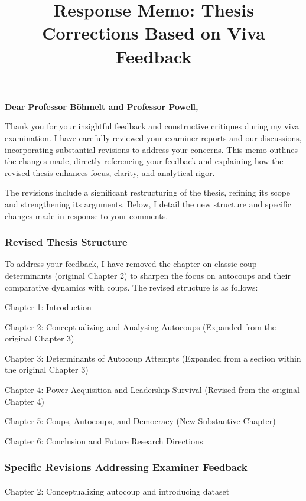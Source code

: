 \documentclass[
  12pt,
  letterpaper,
  DIV=11,
  numbers=noendperiod]{scrartcl}
\title{Response Memo: Thesis Corrections Based on Viva Feedback}
\author{}
\date{}
\makeatletter
\let\oldparagraph\paragraph
\renewcommand{\paragraph}{
    \@ifstar
      \xxxParagraphStar
      \xxxParagraphNoStar
  }
\newcommand{\xxxParagraphStar}[1]{\oldparagraph*{#1}\mbox{}}
\newcommand{\xxxParagraphNoStar}[1]{\oldparagraph{#1}\mbox{}}
\makeatother
\begin{document}
\maketitle


\textbf{Dear Professor Böhmelt and Professor Powell,}

Thank you for your insightful feedback and constructive critiques during
my viva examination. I have carefully reviewed your examiner reports and
our discussions, incorporating substantial revisions to address your
concerns. This memo outlines the changes made, directly referencing your
feedback and explaining how the revised thesis enhances focus, clarity,
and analytical rigor.

The revisions include a significant restructuring of the thesis,
refining its scope and strengthening its arguments. Below, I detail the
new structure and specific changes made in response to your comments.

\subsubsection{Revised Thesis Structure}\label{revised-thesis-structure}

To address your feedback, I have removed the chapter on classic coup
determinants (original Chapter 2) to sharpen the focus on autocoups and
their comparative dynamics with coups. The revised structure is as
follows:

Chapter 1: Introduction

Chapter 2: Conceptualizing and Analysing Autocoups (Expanded from the
original Chapter 3)

Chapter 3: Determinants of Autocoup Attempts (Expanded from a section
within the original Chapter 3)

Chapter 4: Power Acquisition and Leadership Survival (Revised from the
original Chapter 4)

Chapter 5: Coups, Autocoups, and Democracy (New Substantive Chapter)

Chapter 6: Conclusion and Future Research Directions

\subsubsection{Specific Revisions Addressing Examiner
Feedback}\label{specific-revisions-addressing-examiner-feedback}

\paragraph{Chapter 2: Conceptualizing autocoup and introducing
dataset}\label{chapter-2-conceptualizing-autocoup-and-introducing-dataset}
\end{document}
